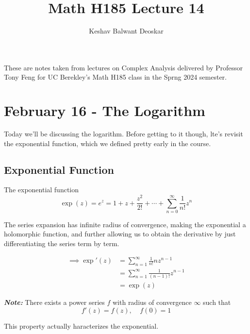 \documentclass{article}
\title{Math H185 Lecture 14}
\author{Keshav Balwant Deoskar}
\begin{document}
\maketitle

These are notes taken from lectures on Complex Analysis delivered by Professor Tony Feng for UC Berekley's Math H185 class in the Sprng 2024 semester.

\tableofcontents

\pagebreak

\section{February 16 - The Logarithm}

\vskip 0.5cm

Today we'll be discussing the logarithm. Before getting to it though, lte's revisit the exponential function, which we defined pretty early in the course.

\subsection{Exponential Function}


\begin{mathdefinitionbox}{The exponential function}
  \[ \exp(z) =  e^z = 1 + z + \frac{z^2}{2!} + \cdots + \sum_{n = 0}^{\infty} \frac{1}{n!} z^n \]
\end{mathdefinitionbox}

\vskip 0.5cm
The series expansion has infinite radius of convergence, making the exponential a holomorphic function, and further allowing us to obtain the derivative by just differentiating the series term by term.

\vskip 0.5cm
\begin{align*}
  \implies \exp'(z) &=\sum_{n=1}^{\infty} \frac{1}{n!} nz^{n-1}\\
  &= \sum_{n=1}^{\infty} \frac{1}{(n-1)!} z^{n-1} \\
  &= \exp(z)
\end{align*}

\vskip 0.5cm
\begin{dottedbox}
  \emph{\textbf{Note:}} There exists a power series $f$ with radius of convergence $\infty$ such that 
  \[ f'(z) = f(z),\;\;\;\;f(0) = 1 \] 

  This property actually haracterizes the exponential.
\end{dottedbox}
\end{document}
